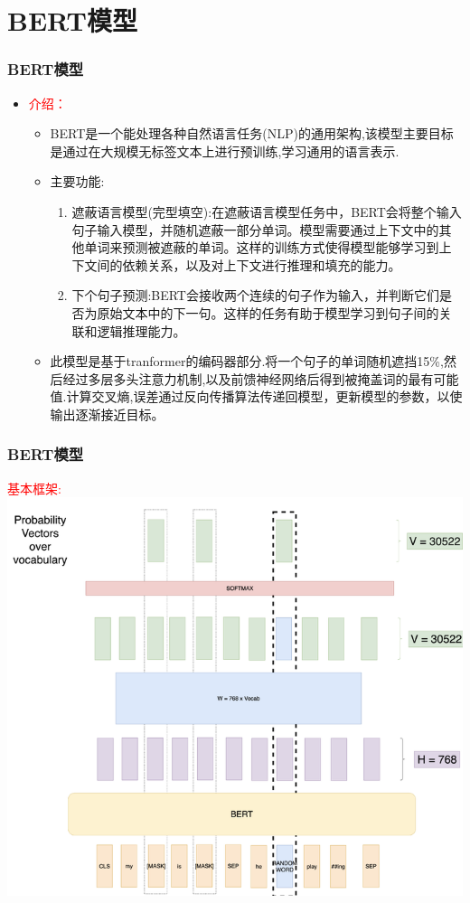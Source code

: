 \documentclass[t]{beamer}
\begin{document}
\begin{CJK*}{UTF8}{gkai}
\begin{frame}
\end{frame}	

\section{BERT模型}

\begin{frame}
	\frametitle{BERT模型}
    \begin{itemize}
		\item
		\textcolor{red}{介绍：}
		\begin{itemize}
		\item BERT是一个能处理各种自然语言任务(NLP)的通用架构,该模型主要目标是通过在大规模无标签文本上进行预训练,学习通用的语言表示.
		\item 主要功能:\\
		\begin{enumerate}
			\item 遮蔽语言模型(完型填空):在遮蔽语言模型任务中，BERT会将整个输入句子输入模型，并随机遮蔽一部分单词。模型需要通过上下文中的其他单词来预测被遮蔽的单词。这样的训练方式使得模型能够学习到上下文间的依赖关系，以及对上下文进行推理和填充的能力。
			\item 下个句子预测:BERT会接收两个连续的句子作为输入，并判断它们是否为原始文本中的下一句。这样的任务有助于模型学习到句子间的关联和逻辑推理能力。
		\end{enumerate}
		\item 此模型是基于tranformer的编码器部分.将一个句子的单词随机遮挡15\%,然后经过多层多头注意力机制,以及前馈神经网络后得到被掩盖词的最有可能值.计算交叉熵,误差通过反向传播算法传递回模型，更新模型的参数，以使输出逐渐接近目标。
		\end{itemize}
	\end{itemize}
\end{frame}


\begin{frame}
	\frametitle{BERT模型}
	\textcolor{red}{	基本框架:}\\
	\includegraphics[scale=0.3]{png/bert.png}
\end{frame}



\end{CJK*}
\end{document}
